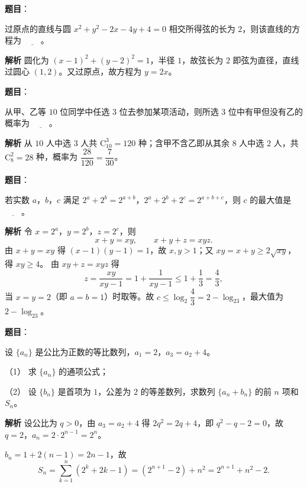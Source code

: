 \begin{answer}

\textbf{题目}：

过原点的直线与圆 $x^2+y^2-2x-4y+4=0$ 相交所得弦的长为 $2$，则该直线的方程为 $\underline{\qquad}$。

\textbf{解析}
圆化为 $(x-1)^2+(y-2)^2=1$，半径 $1$，故弦长为 $2$ 即弦为直径，直线过圆心 $(1,2)$。又过原点，故方程为 $y=2x$。


\end{answer}
\begin{answer}

\textbf{题目}：

从甲、乙等 $10$ 位同学中任选 $3$ 位去参加某项活动，则所选 $3$ 位中有甲但没有乙的概率为 $\underline{\qquad}$。

\textbf{解析}
从 $10$ 人中选 $3$ 人共 $\mathrm C_{10}^3=120$ 种；含甲不含乙即从其余 $8$ 人中选 $2$ 人，共 $\mathrm C_8^2=28$ 种，概率为 $\dfrac{28}{120}=\dfrac7{30}$。


\end{answer}
\begin{answer}

\textbf{题目}：

若实数 $a$，$b$，$c$ 满足 $2^a+2^b=2^{a+b}$，$2^a+2^b+2^c=2^{a+b+c}$，则 $c$ 的最大值是 $\underline{\qquad}$。

\textbf{解析}
令 $x=2^a$，$y=2^b$，$z=2^c$，则
\nopagebreak[4]
\[x+y=xy,\qquad x+y+z=xyz.\]
由 $x+y=xy$ 得 $(x-1)(y-1)=1$，故 $x,y>1$；又 $xy=x+y\geqslant2\sqrt{xy}$，得 $xy\geqslant4$。
由 $xy+z=xyz$ 得
\nopagebreak[4]
\[z=\frac{xy}{xy-1}=1+\frac1{xy-1}\leqslant1+\frac13=\frac43,\]
当 $x=y=2$（即 $a=b=1$）时取等。故 $c\leqslant\log_2\dfrac43=2-\log_23$，最大值为 $2-\log_23$。


\end{answer}
\begin{answer}

\textbf{题目}：

设 $\{a_n\}$ 是公比为正数的等比数列，$a_1=2$，$a_3=a_2+4$。

（1） 求 $\{a_n\}$ 的通项公式；

（2） 设 $\{b_n\}$ 是首项为 $1$，公差为 $2$ 的等差数列，求数列 $\{a_n+b_n\}$ 的前 $n$ 项和 $S_n$。

\textbf{解析}
设公比为 $q>0$，由 $a_3=a_2+4$ 得 $2q^2=2q+4$，即 $q^2-q-2=0$，故 $q=2$，$a_n=2\cdot2^{n-1}=2^n$。

$b_n=1+2(n-1)=2n-1$，故
\nopagebreak[4]
\[S_n=\sum_{k=1}^n(2^k+2k-1)=\left(2^{n+1}-2\right)+n^2=2^{n+1}+n^2-2.\]



\end{answer}
